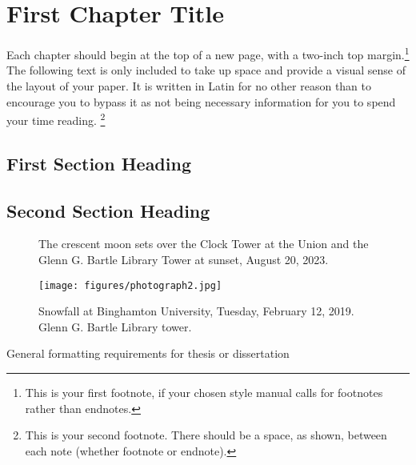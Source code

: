 \chapter{First Chapter Title}

Each chapter should begin at the top of a new page, with a two-inch top margin.\footnote{This is your first footnote, if your chosen style manual calls for footnotes rather than endnotes.}
The following text is only included to take up space and provide a visual sense of the layout of your paper.
It is written in Latin for no other reason than to encourage you to bypass it as not being necessary information for you to spend your time reading.
\blindtext[1] \footnote{This is your second footnote. There should be a space, as shown, between each note (whether footnote or endnote).}

\section{First Section Heading}

\blindtext[2]



\section{Second Section Heading}
\blindtext

\begin{figure}[p]
    \centering
    \caption{The crescent moon sets over the Clock Tower at the Union and the Glenn G. Bartle Library Tower at sunset, August 20, 2023.~\cite{BinghamtonUniversity2023Crescent}}
    \label{fig:photograph}
\end{figure}

\blindtext

\begin{figure}[t]
    \centering
    \texttt{[image: figures/photograph2.jpg]}
    \caption{Snowfall at Binghamton University, Tuesday, February 12, 2019. Glenn G. Bartle Library tower.~\cite{BinghamtonUniversity2023Snowfall}}
    \label{fig:photograph2}
\end{figure}

\blindtext

\begin{table}[p]
    \resizebox{\textwidth}{!}{%
    
    }
    \caption{General formatting requirements for thesis or dissertation}
    \label{tab:general-formatting}
\end{table}